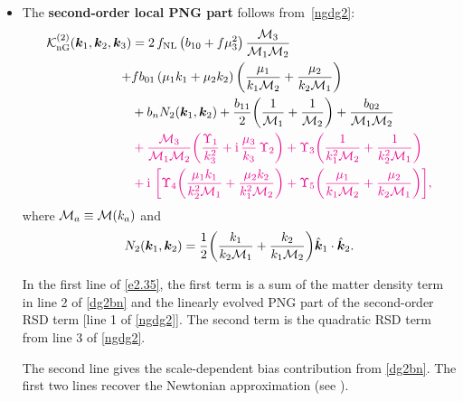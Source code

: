 {{{\begin{itemize}
\item
The {\bfseries second-order local PNG part}  follows from~\eqref{ngdg2}:
\begin{align}
\mathcal{K}^{(2)}_{\mathrm{nG}}(\bm{k}_{1},\bm{k}_{2},\bm{k}_{3}) &= {2}\,f_{\mathrm{NL}}\left(b_{10} + f\mu_{3}^{2}\right) \frac{{\cal M}_{3}}{{\cal M}_{1}{\cal M}_{2}} \nonumber \\
+& f b_{01}\left(\mu_1k_1+\mu_2k_2\right) \left(\frac{\mu_1}{k_1{\cal M}_{2}} + \frac{\mu_2}{k_2 {\cal M}_{1}} \right)
\notag 
\\  &
+ b_{n}{N}_{2}(\bm{k}_{1},\bm{k}_{2})  + \frac{b_{11}}{2}\bigg(\frac{1}{{\cal M}_{1}} + \frac{1}{{\cal M}_{2}}\bigg) 
+\frac{b_{02}}{{\cal M}_{1}{\cal M}_{2}} 
\notag \\ &
{\color{magenta}{{}+\frac{{\cal M}_3}{{\cal M}_{1}{\cal M}_{2}}\bigg( \frac{\Upsilon_{1}}{k_3^2} + \mathrm{i}\,\frac{\mu_{3}}{k_3}\,\Upsilon_{2} \bigg) 
+{\Upsilon_{3}} \bigg(\frac{1}{k_{1}^{2}{\cal M}_{2}} + \frac{1}{k_{2}^{2}{\cal M}_{1}}\bigg) }}
\nonumber \\
 &
{\color{magenta}{{} + \mathrm{i\,}\,\bigg[{\Upsilon_{4}}\bigg(\frac{\mu_{1}k_{1}}{k_2^2{\cal M}_{1}} + \frac{\mu_{2}k_{2}}{k_1^2{\cal M}_{2}}\bigg)  
 +{\Upsilon_{5}} \bigg(\frac{\mu_{1}}{k_1{\cal M}_{2}} + \frac{\mu_{2}}{k_2{\cal M}_{1}}\bigg) \bigg] ,}} \label{e2.35} 
\end{align}
where ${\cal M}_a \equiv {\cal M}(k_a)$ and
\begin{equation}
N_{2}(\bm{k}_{1},\bm{k}_{2}) = \frac{1}{2} \bigg(\frac{k_1}{k_2{\cal M}_1 }+ \frac{k_2}{k_1{\cal M}_2 } \bigg) \hat{\bm {k}}_1\cdot \hat{\bm {k}}_2 . \label{n2k}
\end{equation}


In the first line of \eqref{e2.35}, the first term is a sum of the  matter density term in line 2 of \eqref{dg2bn} and the linearly evolved PNG part of the second-order RSD term [line 1 of  \eqref{ngdg2}]. The second term is the quadratic RSD term from line 3 of \eqref{ngdg2}. 

The second line gives the scale-dependent bias contribution from \eqref{dg2bn}. The first two lines recover the Newtonian approximation (see \cite{Tellarini:2015faa}). 


\end{itemize}}}}
